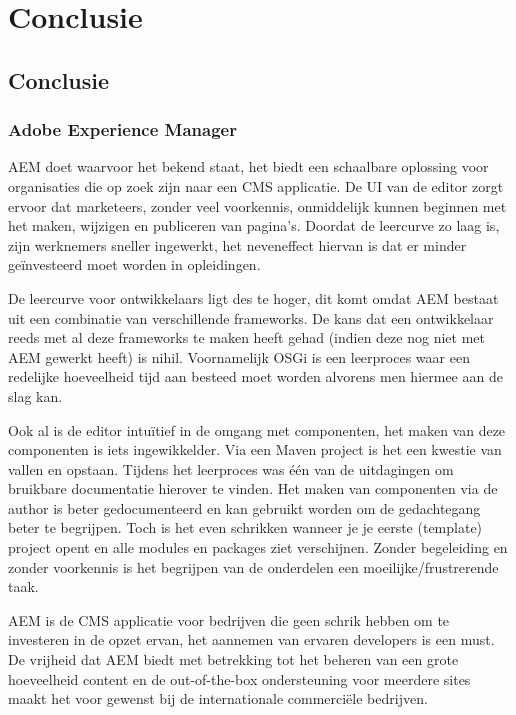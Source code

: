 \chapter{Conclusie}
	\section{Conclusie}
    \subsection{Adobe Experience Manager}
    AEM doet waarvoor het bekend staat, het biedt een schaalbare oplossing voor organisaties die op zoek zijn naar een CMS applicatie. 
    De UI van de editor zorgt ervoor dat marketeers, zonder veel voorkennis, onmiddelijk kunnen beginnen met het maken, wijzigen en publiceren van pagina's. 
    Doordat de leercurve zo laag is, zijn werknemers sneller ingewerkt, het neveneffect hiervan is dat er minder geïnvesteerd moet worden in opleidingen.
    \par
    De leercurve voor ontwikkelaars ligt des te hoger, dit komt omdat AEM bestaat uit een combinatie van verschillende frameworks. 
    De kans dat een ontwikkelaar reeds met al deze frameworks te maken heeft gehad (indien deze nog niet met AEM gewerkt heeft) is nihil.
    Voornamelijk OSGi is een leerproces waar een redelijke hoeveelheid tijd aan besteed moet worden alvorens men hiermee aan de slag kan.
    \par
    Ook al is de editor intuïtief in de omgang met componenten, het maken van deze componenten is iets ingewikkelder. Via een Maven project
    is het een kwestie van vallen en opstaan. Tijdens het leerproces was \'e\'en van de uitdagingen om bruikbare documentatie hierover te vinden. 
    Het maken van componenten via de author is beter gedocumenteerd en kan gebruikt worden om de gedachtegang beter te begrijpen. 
    Toch is het even schrikken wanneer je je eerste (template) project opent en alle modules en packages ziet verschijnen.
    Zonder begeleiding en zonder voorkennis is het begrijpen van de onderdelen een moeilijke/frustrerende taak.
    \par
    AEM is de CMS applicatie voor bedrijven die geen schrik hebben om te investeren in de opzet ervan, het aannemen van ervaren developers is een must.
    De vrijheid dat AEM biedt met betrekking tot het beheren van een grote hoeveelheid content en de out-of-the-box ondersteuning voor meerdere sites maakt
    het voor gewenst bij de internationale commerciële bedrijven. 
